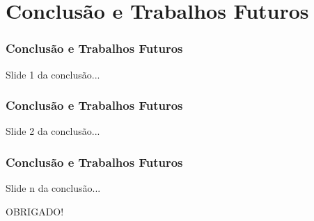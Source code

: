 \section{Conclusão e Trabalhos Futuros}


\begin{frame}

    \frametitle{Conclusão e Trabalhos Futuros}

    Slide 1 da conclusão...

\end{frame}


\begin{frame}

    \frametitle{Conclusão e Trabalhos Futuros}

    Slide 2 da conclusão...

\end{frame}


\begin{frame}

    \frametitle{Conclusão e Trabalhos Futuros}

    Slide n da conclusão...

\end{frame}


\begin{frame}
    \begin{center}
        \Huge{OBRIGADO!}
    \end{center}
\end{frame}
